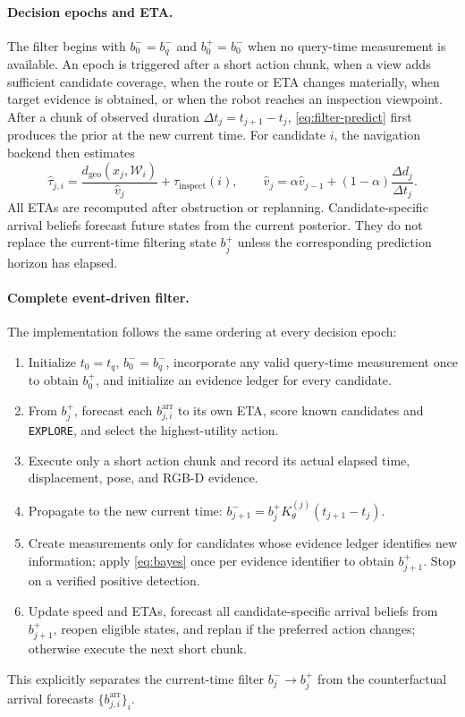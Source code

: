 \paragraph{Decision epochs and ETA.}
The filter begins with $b_0^-=b_q^-$ and $b_0^+=b_0^-$ when no query-time
measurement is available. An epoch is triggered after a short action chunk,
when a view adds sufficient candidate coverage, when the route or ETA changes
materially, when target evidence is obtained, or when the robot reaches an
inspection viewpoint. After a chunk of observed duration
$\Delta t_j=t_{j+1}-t_j$, \cref{eq:filter-predict} first produces the prior at
the new current time. For candidate $i$, the navigation backend then estimates
\begin{equation}
\widehat\tau_{j,i}=\frac{d_{\mathrm{geo}}(x_j,\mathcal W_i)}{\widehat v_j}
+\tau_{\mathrm{inspect}}(i),\qquad
\widehat v_j=\alpha\widehat v_{j-1}+(1-\alpha)\frac{\Delta d_j}{\Delta t_j}.
\label{eq:eta}
\end{equation}
All ETAs are recomputed after obstruction or replanning. Candidate-specific
arrival beliefs forecast future states from the current posterior. They do not
replace the current-time filtering state $b_j^+$ unless the corresponding
prediction horizon has elapsed.

\paragraph{Complete event-driven filter.}
The implementation follows the same ordering at every decision epoch:
\begin{enumerate}[leftmargin=1.55em,itemsep=0pt,topsep=2pt]
    \item Initialize $t_0=t_q$, $b_0^-=b_q^-$, incorporate any valid
    query-time measurement once to obtain $b_0^+$, and initialize an evidence
    ledger for every candidate.
    \item From $b_j^+$, forecast each $b_{j,i}^{\mathrm{arr}}$ to its own ETA,
    score known candidates and \texttt{EXPLORE}, and select the highest-utility
    action.
    \item Execute only a short action chunk and record its actual elapsed time,
    displacement, pose, and RGB-D evidence.
    \item Propagate to the new current time:
    $b_{j+1}^-=b_j^+K_\theta^{(j)}(t_{j+1}-t_j)$.
    \item Create measurements only for candidates whose evidence ledger identifies
    new information; apply \cref{eq:bayes} once per evidence identifier to
    obtain $b_{j+1}^+$. Stop on a verified positive detection.
    \item Update speed and ETAs, forecast all candidate-specific arrival
    beliefs from $b_{j+1}^+$, reopen eligible states, and replan if the preferred
    action changes; otherwise execute the next short chunk.
\end{enumerate}
This explicitly separates the current-time filter
$b_j^-\rightarrow b_j^+$ from the counterfactual arrival forecasts
$\{b_{j,i}^{\mathrm{arr}}\}_i$.

